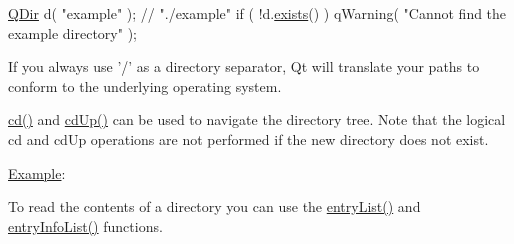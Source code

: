 \begin{DoxyCode}
\hyperlink{class_q_dir}{QDir} d( \textcolor{stringliteral}{"example"} );          \textcolor{comment}{// "./example"}
\textcolor{keywordflow}{if} ( !d.\hyperlink{class_q_dir_a74bdced855aaba94868b77f21398775c}{exists}() )
qWarning( \textcolor{stringliteral}{"Cannot find the example directory"} );
\end{DoxyCode}


If you always use '/' as a directory separator, Qt will translate your paths to conform to the underlying operating system.

\hyperlink{class_q_dir_abfc428d349712e9d797fc713837e3c43}{cd()} and \hyperlink{class_q_dir_abb27c61db0ff785666cbd38b73e72af3}{cd\-Up()} can be used to navigate the directory tree. Note that the logical cd and cd\-Up operations are not performed if the new directory does not exist.

\hyperlink{struct_example}{Example}\-: 


To read the contents of a directory you can use the \hyperlink{class_q_dir_a31d8fe19dd240c844af9cf44e988384f}{entry\-List()} and \hyperlink{class_q_dir_a455adcdcb8360dda877b634a8aca27fe}{entry\-Info\-List()} functions.

